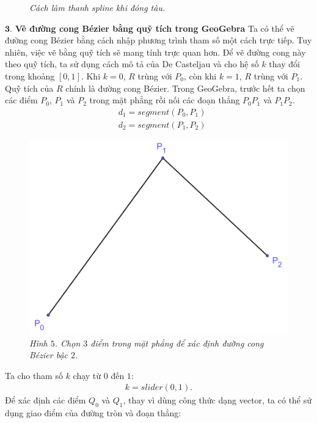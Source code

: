 \begin{multicols}{2}
{\begin{figure}[H]
		\caption{\small\textit{\color{toanhocdoisong}Cách làm thanh spline khi đóng tàu.}}
	\end{figure}}
	$\pmb3.$ \textbf{\color{toanhocdoisong}Vẽ đường cong Bézier bằng quỹ tích trong GeoGebra}
	\vskip 0.1cm
	Ta có thể vẽ đường cong Bézier bằng cách nhập phương trình tham số một cách trực tiếp. Tuy nhiên, việc vẽ bằng quỹ tích sẽ mang tính trực quan hơn. Để vẽ đường cong này theo quỹ tích, ta sử dụng cách mô tả của De Casteljau và cho hệ số $k$ thay đổi trong khoảng $[0,1]$. Khi $k=0$, $R$ trùng với $P_0$, còn khi $k=1$, $R$ trùng với $P_1$. Quỹ tích của $R$ chính là đường cong Bézier.
	\vskip 0.1cm
	Trong GeoGebra, trước hết ta chọn các điểm $P_0$, $P_1$ và $P_2$ trong mặt phẳng rồi nối các đoạn thẳng $P_0 P_1$ và $P_1 P_2$.
	\begin{align*}
		&d_1= segment (P_0,P_1)\\
		&d_2= segment (P_1,P_2)
	\end{align*}
	\begin{figure}[H]
		\vspace*{-5pt}
		\centering
		\captionsetup{labelformat= empty, justification=centering}
		\includegraphics[width= 0.8\linewidth]{9}
		\caption{\small\textit{\color{toanhocdoisong}Hình $5$. Chọn $3$ điểm trong mặt phẳng để xác định đường cong Bézier bậc $2$.}}
		\vspace*{-10pt}
	\end{figure}
	Ta cho tham số $k$ chạy từ $0$ đến $1$:
	\begin{align*}
		k = slider (0,1).
	\end{align*}
	Để xác định các điểm $Q_0$ và $Q_1$, thay vì dùng công thức dạng vector, ta có thể sử dụng giao điểm của đường tròn và đoạn thẳng:
	\begin{align*}

\end{align*}
\end{multicols}

